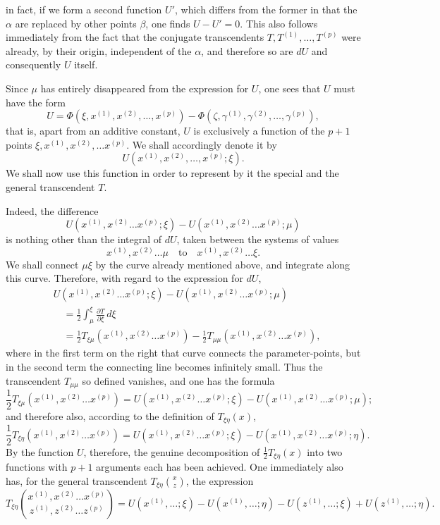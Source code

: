 \documentclass[10pt]{article}
\begin{document}
in fact, if we form a second function \(U'\), which differs from the former in that the \(\alpha\) are replaced by other points \(\beta\), one finds \(U-U'=0\). This also follows immediately from the fact that the conjugate transcendents \(T,T^{(1)},\ldots,T^{(p)}\) were already, by their origin, independent of the \(\alpha\), and therefore so are \(dU\) and consequently \(U\) itself.

Since \(\mu\) has entirely disappeared from the expression for \(U\), one sees that \(U\) must have the form
\[
U=\Phi(\xi,x^{(1)},x^{(2)},\ldots,x^{(p)})-\Phi(\zeta,\gamma^{(1)},\gamma^{(2)},\ldots,\gamma^{(p)}),
\]
that is, apart from an additive constant, \(U\) is exclusively a function of the \(p+1\) points \(\xi,x^{(1)},x^{(2)},\ldots x^{(p)}\). We shall accordingly denote it by
\[
U(x^{(1)},x^{(2)},\ldots,x^{(p)};\xi).
\]
We shall now use this function in order to represent by it the special and the general transcendent \(T\).

Indeed, the difference
\[
U(x^{(1)},x^{(2)}\ldots x^{(p)};\xi)-U(x^{(1)},x^{(2)}\ldots x^{(p)};\mu)
\]
is nothing other than the integral of \(dU\), taken between the systems of values
\[
x^{(1)},x^{(2)}\ldots\mu\quad \text{to}\quad x^{(1)},x^{(2)}\ldots\xi.
\]
We shall connect \(\mu\xi\) by the curve already mentioned above, and integrate along this curve. Therefore, with regard to the expression for \(dU\),
\[
\begin{aligned}
&U(x^{(1)},x^{(2)}\ldots x^{(p)};\xi)-U(x^{(1)},x^{(2)}\ldots x^{(p)};\mu)\\
&\quad=\frac12\int_{\mu}^{\xi}\frac{\partial T}{\partial\xi}\,d\xi\\
&\quad=\frac12T_{\xi\mu}(x^{(1)},x^{(2)}\ldots x^{(p)})
-\frac12T_{\mu\mu}(x^{(1)},x^{(2)}\ldots x^{(p)}),
\end{aligned}
\]
where in the first term on the right that curve connects the parameter-points, but in the second term the connecting line becomes infinitely small. Thus the transcendent \(T_{\mu\mu}\) so defined vanishes, and one has the formula
\[
\frac12T_{\xi\mu}(x^{(1)},x^{(2)}\ldots x^{(p)})=U(x^{(1)},x^{(2)}\ldots x^{(p)};\xi)-U(x^{(1)},x^{(2)}\ldots x^{(p)};\mu);
\]
and therefore also, according to the definition of \(T_{\xi\eta}(x)\),
\[
\frac12T_{\xi\eta}(x^{(1)},x^{(2)}\ldots x^{(p)})=U(x^{(1)},x^{(2)}\ldots x^{(p)};\xi)-U(x^{(1)},x^{(2)}\ldots x^{(p)};\eta).
\]
By the function \(U\), therefore, the genuine decomposition of \(\frac12T_{\xi\eta}(x)\) into two functions with \(p+1\) arguments each has been achieved. One immediately also has, for the general transcendent \(T_{\xi\eta}\binom{x}{z}\), the expression
\[
T_{\xi\eta}\binom{x^{(1)},x^{(2)}\ldots x^{(p)}}{z^{(1)},z^{(2)}\ldots z^{(p)}}
=U(x^{(1)},\ldots;\xi)-U(x^{(1)},\ldots;\eta)-U(z^{(1)},\ldots;\xi)+U(z^{(1)},\ldots;\eta).
\]
\end{document}
